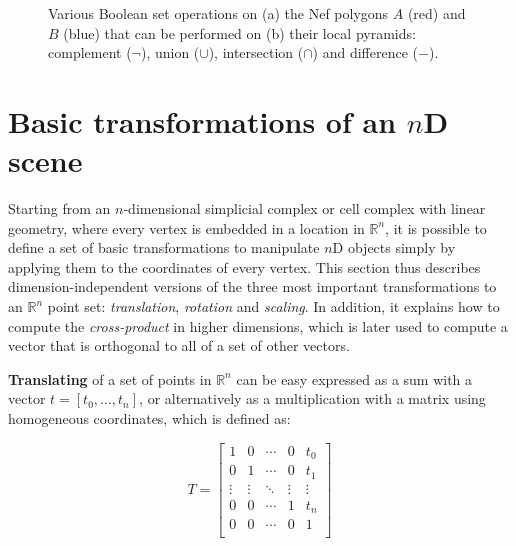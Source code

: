 \begin{figure}[tb]
\quad
{}
\caption[Boolean set operations on Nef polygons]{Various Boolean set operations on (a) the Nef polygons $A$ (red) and $B$ (blue) that can be performed on (b) their local pyramids: complement ($\neg$), union ($\cup$), intersection ($\cap$) and difference ($-$).}
\label{fig:nef-boolean}
\end{figure}

\section{Basic transformations of an $n$D scene}
\label{se:ndmath}

Starting from an $n$-dimensional simplicial complex or cell complex with linear geometry, where every vertex is embedded in a location in $\mathbb{R}^n$, it is possible to define a set of basic transformations to manipulate $n$D objects simply by applying them to the coordinates of every vertex.
This section thus describes dimension-independent versions of the three most important transformations to an $\mathbb{R}^n$ point set: \emph{translation}, \emph{rotation} and \emph{scaling}.
In addition, it explains how to compute the \emph{cross-product} in higher dimensions, which is later used to compute a vector that is orthogonal to all of a set of other vectors.

\textbf{Translating} of a set of points in $\mathbb{R}^n$ can be easy expressed as a sum with a vector $t = \left[t_0, \ldots, t_n\right]$, or alternatively as a multiplication with a matrix using homogeneous coordinates, which is defined as:

\begin{equation*}
T = \begin{bmatrix}
1 & 0 & \cdots & 0 & t_0 \\
0 & 1 & \cdots & 0 & t_1 \\
\vdots & \vdots & \ddots & \vdots & \vdots \\
0 & 0 & \cdots & 1 & t_n \\
0 & 0 & \cdots & 0 & 1 \\
\end{bmatrix}
\end{equation*}

